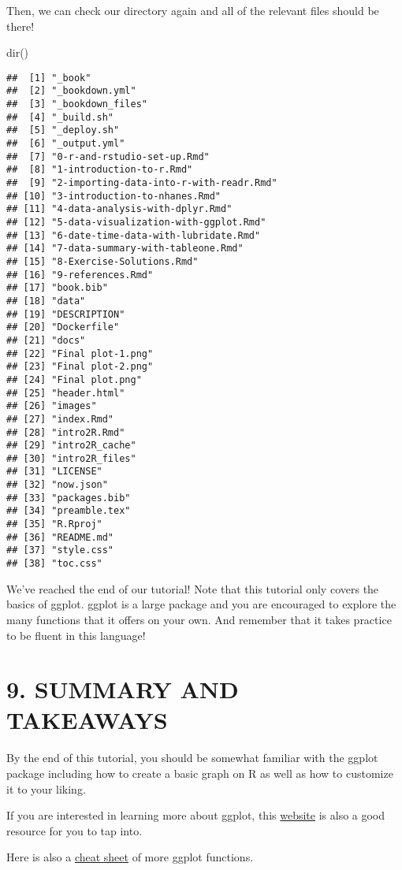 \documentclass[
]{book}
\newenvironment{Shaded}{\begin{snugshade}}{\end{snugshade}}
\newcommand{\FunctionTok}[1]{\textcolor[rgb]{0.00,0.00,0.00}{#1}}
\newcommand{\NormalTok}[1]{#1}
\begin{document}
Then, we can check our directory again and all of the relevant files should be there!

\begin{Shaded}
\begin{Highlighting}[]
\FunctionTok{dir}\NormalTok{()}
\end{Highlighting}
\end{Shaded}

\begin{verbatim}
##  [1] "_book"
##  [2] "_bookdown.yml"
##  [3] "_bookdown_files"
##  [4] "_build.sh"
##  [5] "_deploy.sh"
##  [6] "_output.yml"
##  [7] "0-r-and-rstudio-set-up.Rmd"
##  [8] "1-introduction-to-r.Rmd"
##  [9] "2-importing-data-into-r-with-readr.Rmd"
## [10] "3-introduction-to-nhanes.Rmd"
## [11] "4-data-analysis-with-dplyr.Rmd"
## [12] "5-data-visualization-with-ggplot.Rmd"
## [13] "6-date-time-data-with-lubridate.Rmd"
## [14] "7-data-summary-with-tableone.Rmd"
## [15] "8-Exercise-Solutions.Rmd"
## [16] "9-references.Rmd"
## [17] "book.bib"
## [18] "data"
## [19] "DESCRIPTION"
## [20] "Dockerfile"
## [21] "docs"
## [22] "Final plot-1.png"
## [23] "Final plot-2.png"
## [24] "Final plot.png"
## [25] "header.html"
## [26] "images"
## [27] "index.Rmd"
## [28] "intro2R.Rmd"
## [29] "intro2R_cache"
## [30] "intro2R_files"
## [31] "LICENSE"
## [32] "now.json"
## [33] "packages.bib"
## [34] "preamble.tex"
## [35] "R.Rproj"
## [36] "README.md"
## [37] "style.css"
## [38] "toc.css"
\end{verbatim}

We've reached the end of our tutorial! Note that this tutorial only covers the basics of ggplot. ggplot is a large package and you are encouraged to explore the many functions that it offers on your own. And remember that it takes practice to be fluent in this language!

\hypertarget{summary-and-takeaways}{%
\section{9. SUMMARY AND TAKEAWAYS}\label{summary-and-takeaways}}

By the end of this tutorial, you should be somewhat familiar with the ggplot package including how to create a basic graph on R as well as how to customize it to your liking.

If you are interested in learning more about ggplot, this \href{https://ggplot2.tidyverse.org/}{website} is also a good resource for you to tap into.

Here is also a \href{https://github.com/rstudio/cheatsheets/blob/master/data-visualization-2.1.pdf}{cheat sheet} of more ggplot functions.
\end{document}
